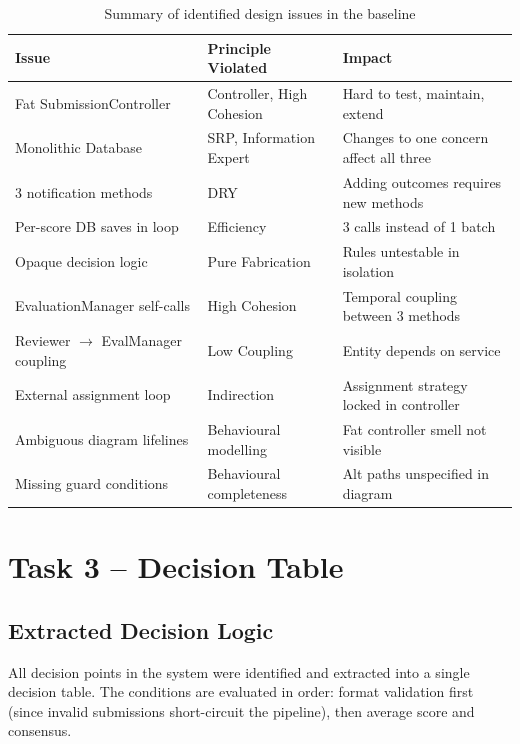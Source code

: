 \documentclass[12pt, a4paper]{article}
\begin{document}
\begin{table}[H]
\centering
\caption{Summary of identified design issues in the baseline}
\label{tab:design-issues}
\begin{tabularx}{\textwidth}{X l X}
    \toprule
    \textbf{Issue} & \textbf{Principle Violated} & \textbf{Impact} \\
    \midrule
    Fat SubmissionController & Controller, High Cohesion & Hard to test, maintain, extend \\
    Monolithic Database & SRP, Information Expert & Changes to one concern affect all three \\
    3 notification methods & DRY & Adding outcomes requires new methods \\
    Per-score DB saves in loop & Efficiency & 3 calls instead of 1 batch \\
    Opaque decision logic & Pure Fabrication & Rules untestable in isolation \\
    EvaluationManager self-calls & High Cohesion & Temporal coupling between 3 methods \\
    Reviewer $\rightarrow$ EvalManager coupling & Low Coupling & Entity depends on service \\
    External assignment loop & Indirection & Assignment strategy locked in controller \\
    Ambiguous diagram lifelines & Behavioural modelling & Fat controller smell not visible \\
    Missing guard conditions & Behavioural completeness & Alt paths unspecified in diagram \\
    \bottomrule
\end{tabularx}
\end{table}

\section{Task 3 -- Decision Table}
\label{sec:task3}

\subsection{Extracted Decision Logic}

All decision points in the system were identified and extracted into a single decision table. The conditions are evaluated in order: format validation first (since invalid submissions short-circuit the pipeline), then average score and consensus.
\end{document}
